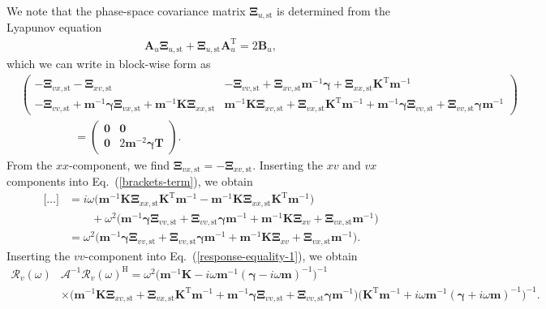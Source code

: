 \documentclass[aps,pre,twocolumn,superscriptaddress,notitlepage]{revtex4-2}
\newcommand{\nn}{\nonumber \\}
\newcommand{\n}{\nonumber}
\newcommand{\bmc}[1]{\bm{\mathcal{#1}}}
\renewcommand{\eqref}[1]{Eq.~(\ref{#1})}
\begin{document}
We note that the phase-space covariance matrix $\bm{\Xi}_{u,\text{st}}$ is determined from the Lyapunov equation
\begin{align}
\bm{A}_u \bm{\Xi}_{u,\text{st}} + \bm{\Xi}_{u,\text{st}} \bm{A}_u^\text{T} = 2 \bm{B}_u ,
\end{align}
which we can write in block-wise form as
\begin{align}
&\begin{pmatrix}
- \bm{\Xi}_{vx,\text{st}} - \bm{\Xi}_{xv,\text{st}} & - \bm{\Xi}_{vv,\text{st}}  + \bm{\Xi}_{xv,\text{st}} \bm{m}^{-1} \bm{\gamma} + \bm{\Xi}_{xx,\text{st}} \bm{K}^\text{T} \bm{m}^{-1} \\
- \bm{\Xi}_{vv,\text{st}} + \bm{m}^{-1} \bm{\gamma} \bm{\Xi}_{vx,\text{st}} + \bm{m}^{-1} \bm{K} \bm{\Xi}_{xx,\text{st}}  & \bm{m}^{-1} \bm{K} \bm{\Xi}_{xv,\text{st}} + \bm{\Xi}_{vx,\text{st}} \bm{K}^\text{T} \bm{m}^{-1} + \bm{m}^{-1} \bm{\gamma} \bm{\Xi}_{vv,\text{st}} + \bm{\Xi}_{vv,\text{st}} \bm{\gamma} \bm{m}^{-1}
\end{pmatrix}  \nn
&\hspace{2cm} = \begin{pmatrix}
\bm{0} & \bm{0} \\ \bm{0} & 2 \bm{m}^{-2} \bm{\gamma} \bm{T}
\end{pmatrix} . \label{lyapunov-under}
\end{align}
From the $xx$-component, we find $\bm{\Xi}_{vx,\text{st}} = - \bm{\Xi}_{xv,\text{st}}$.
Inserting the $xv$ and $vx$ components into \eqref{brackets-term}, we obtain
\begin{align}
\bigg[ \ldots \bigg] &= i \omega \Big( \bm{m}^{-1} \bm{K} \bm{\Xi}_{xx,\text{st}} \bm{K}^\text{T} \bm{m}^{-1} - \bm{m}^{-1} \bm{K} \bm{\Xi}_{xx,\text{st}} \bm{K}^\text{T} \bm{m}^{-1} \Big) \label{brackets-term-2} \\
& \qquad + \omega^2 \Big( \bm{m}^{-1} \bm{\gamma} \bm{\Xi}_{vv,\text{st}} + \bm{\Xi}_{vv,\text{st}} \bm{\gamma} \bm{m}^{-1} + \bm{m}^{-1} \bm{K} \bm{\Xi}_{xv} + \bm{\Xi}_{vx,\text{st}} \bm{m}^{-1} \Big) \nn
&= \omega^2 \Big( \bm{m}^{-1} \bm{\gamma} \bm{\Xi}_{vv,\text{st}} + \bm{\Xi}_{vv,\text{st}} \bm{\gamma} \bm{m}^{-1} + \bm{m}^{-1} \bm{K} \bm{\Xi}_{xv} + \bm{\Xi}_{vx,\text{st}} \bm{m}^{-1} \Big) \n  .
\end{align}
Inserting the $vv$-component into \eqref{response-equality-1}, we obtain
\begin{align}
\bmc{R}_v(\omega) &\bmc{A}^{-1} \bmc{R}_v(\omega)^\text{H} = \omega^2 \big( \bm{m}^{-1} \bm{K} - i \omega \bm{m}^{-1} (\bm{\gamma} - i \omega \bm{m})^{-1} \big)^{-1} \\
&\times \big( \bm{m}^{-1} \bm{K} \bm{\Xi}_{xv,\text{st}} + \bm{\Xi}_{vx,\text{st}} \bm{K}^\text{T} \bm{m}^{-1} + \bm{m}^{-1} \bm{\gamma} \bm{\Xi}_{vv,\text{st}} + \bm{\Xi}_{vv,\text{st}} \bm{\gamma} \bm{m}^{-1} \big) \big(  \bm{K}^\text{T} \bm{m}^{-1} + i \omega \bm{m}^{-1} (\bm{\gamma} + i \omega \bm{m})^{-1} \big)^{-1} . \n
\end{align}
\end{document}
